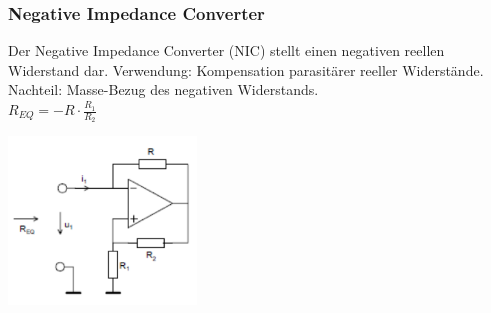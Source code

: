        	 \begin{minipage}[c]{12cm}
       	 \subsubsection{Negative Impedance Converter}
       	 	Der Negative Impedance Converter (NIC) stellt einen negativen reellen Widerstand
       	 	dar. Verwendung: Kompensation parasitärer reeller Widerstände. \\
       	 	Nachteil: Masse-Bezug des negativen Widerstands. \bigskip \\
       	 	$R_{EQ}=-R \cdot \frac{R_1}{R_2}$\\
       	 \end{minipage}
       	 \begin{minipage}[c]{5cm}
       	 	\includegraphics[width=5cm]{./images/neg-imp-conv.png}
       	 \end{minipage}
   
